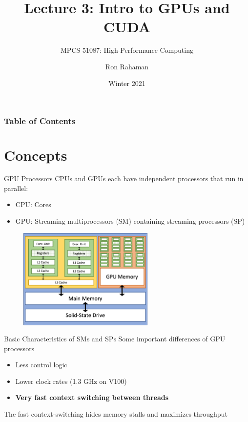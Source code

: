\documentclass{beamer}
\title{Lecture 3: Intro to GPUs and CUDA}
\subtitle{MPCS 51087: High-Performance Computing}
\date{Winter 2021}
\author{Ron Rahaman}
\institute{The University of Chicago, Dept of Computer Science}
\begin{document}
    \maketitle

    \begin{frame}
        \frametitle{Table of Contents}
        \tableofcontents[]
    \end{frame}

    \section{Concepts}

    \begin{frame}{GPU Processors}
            CPUs and GPUs each have independent processors that run in parallel:
            \begin{itemize}
                \item CPU: Cores
                \item GPU: Streaming multiprocessors (SM) containing streaming processors (SP)
            \end{itemize}
        \begin{figure}
            \centering
            \includegraphics[width=0.6\textwidth]{img/01/mem_hier_node_gpu.png}
        \end{figure}
    \end{frame}

    \begin{frame}{Basic Characteristics of SMs and SPs}
        Some important differences of GPU processors
        \begin{itemize}
            \item Less control logic
            \item Lower clock rates (1.3 GHz on V100)
            \item \textbf{Very fast context switching between threads}
        \end{itemize}
        The fast context-switching hides memory stalls and maximizes throughput
    \end{frame}
\end{document}

